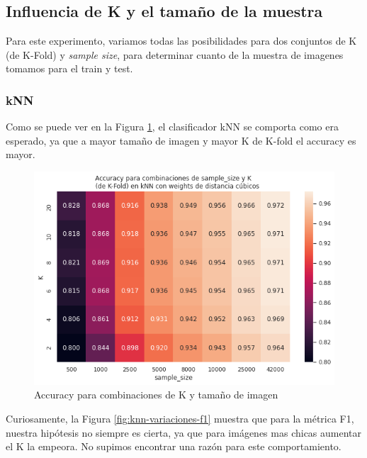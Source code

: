 \documentclass[a4paper]{article}
\begin{document}
    \subsection{Influencia de K y el tamaño de la muestra}
    Para este experimento, variamos todas las posibilidades para dos conjuntos de K (de K-Fold) y \textit{sample size}, para determinar cuanto de la muestra de imagenes tomamos para el train y test.
    \subsubsection{kNN}
    Como se puede ver en la Figura \ref{fig:knn-variaciones-acc}, el clasificador kNN se comporta como era esperado, ya que a mayor tamaño de imagen y mayor K de K-fold el accuracy es mayor.
    
    \begin{figure}[H]
        \centering
        \includegraphics[scale=0.65]{img/exp/knn/knn_variaciones.png}
        \caption{Accuracy para combinaciones de K y tamaño de imagen}
        \label{fig:knn-variaciones-acc}
    \end{figure}
    
    Curiosamente, la Figura \ref{fig:knn-variaciones-f1} muestra que para la métrica F1, nuestra hipótesis no siempre es cierta, ya que para imágenes mas chicas aumentar el K la empeora. No supimos encontrar una razón para este comportamiento.
    
\end{document}

